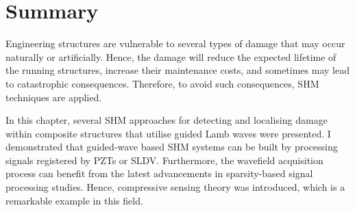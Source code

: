 \section{Summary}
\label{sec24}
Engineering structures are vulnerable to several types of damage that may occur naturally or artificially.
Hence, the damage will reduce the expected lifetime of the running structures, increase their maintenance costs, and sometimes may lead to catastro\-phic consequences. 
Therefore, to avoid such consequences, SHM techniques are applied.

In this chapter,  several SHM approaches for detecting and localising damage within composite structures that utilise guided Lamb waves were presented.
I demonstrated that guided-wave based SHM systems can be built by processing signals registered by PZTs or SLDV.
Furthermore, the wavefield acquisition process can benefit from the latest advancements in sparsity-based signal processing studies.
Hence, compressive sensing theory was introduced, which is a remarkable example in this field.
